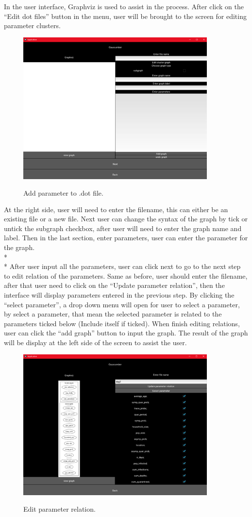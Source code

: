 In the user interface, Graphviz is used to assist in the process. After click on the “Edit dot files” button in the menu, user will be brought to the screen for editing parameter clusters. 
\begin{figure}[H]
	\centering
	\includegraphics[width=10cm]{figures/editDot1Screen.png}\\
	\caption{Add parameter to .dot file.}
	\label{fig:figure14}
\end{figure}
At the right side, user will need to enter the filename, this can either be an existing file or a new file. Next user can change the syntax of the graph by tick or untick the subgraph checkbox, after user will need to enter the graph name and label. Then in the last section, enter parameters, user can enter the parameter for the graph.\\*\\*
After user input all the parameters, user can click next to go to the next step to edit relation of the parameters. Same as before, user should enter the filename, after that user need to click on the “Update parameter relation”, then the interface will display parameters entered in the previous step. By clicking the “select parameter”, a drop down menu will open for user to select a parameter, by select a parameter, that mean the selected parameter is related to the parameters ticked below (Include itself if ticked). When finish editing relations, user can click the “add graph” button to input the graph. The result of the graph will be display at the left side of the screen to assist the user. 
\begin{figure}[H]
	\centering
	\includegraphics[width=10cm]{figures/editDot2Screen.png}\\
	\caption{Edit parameter relation.}
	\label{fig:figure15}
\end{figure}

